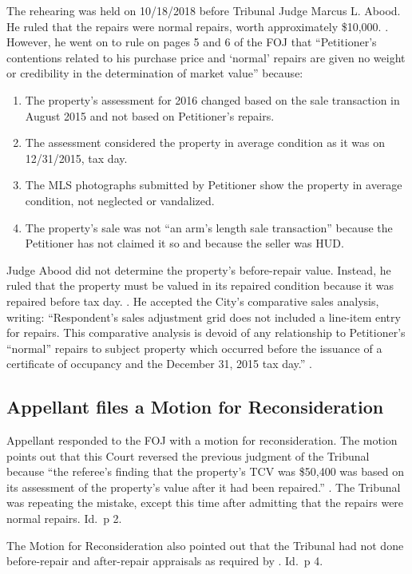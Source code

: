 \documentclass[12pt,\documentclassflag]{michiganCourtOfAppealsBrief}
\begin{document}
The rehearing was held on 10/18/2018 before Tribunal Judge Marcus L. Abood. He ruled that the repairs were normal repairs, worth approximately \$10,000. \foj[4]. However, he went on to rule on pages 5 and 6 of the FOJ that ``Petitioner's contentions related to his purchase price and `normal' repairs are given no weight or credibility in the determination of market value'' because:
\begin{enumerate}
\item The property's assessment for 2016 changed based on the sale transaction in August 2015 and not based on Petitioner's repairs. 
\item The assessment considered the property in average condition as it was on 12/31/2015, tax day.
\item The MLS photographs submitted by Petitioner show the property in average condition, not neglected or vandalized.
\item The property's sale was not ``an arm's length sale transaction'' because the Petitioner has not claimed it so and because the seller was HUD.
\end{enumerate}

Judge Abood did not determine the property's before-repair value. Instead, he ruled that the property must be valued in its repaired condition because it was repaired before tax day. \foj[5]. He accepted the City's comparative sales analysis, writing: ``Respondent's sales adjustment grid does not included a line-item entry for repairs. This comparative analysis is devoid of any relationship to Petitioner's ``normal'' repairs to subject property which occurred before the issuance of a certificate of occupancy and the December 31, 2015 tax day.'' \foj[6].

\subsection{Appellant files a Motion for Reconsideration}

Appellant responded to the FOJ with a motion for reconsideration. The motion points out that this Court reversed the previous judgment of the Tribunal because  ``the referee's finding that the property's TCV was \$50,400 was based on its assessment of the property's value after it had been repaired.'' \motionForReconsideration[1]. The Tribunal was repeating the mistake, except this time after admitting that the repairs were normal repairs. Id.\ p 2. 

The Motion for Reconsideration also pointed out that the Tribunal had not done before-repair and after-repair appraisals as required by \mathieuGast. Id.\ p 4.
\end{document}
